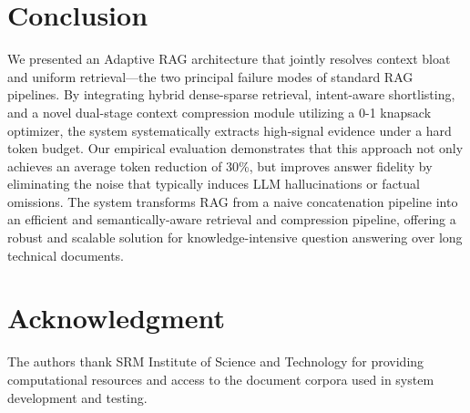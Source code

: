 \documentclass[conference]{IEEEtran}
\begin{document}
\section{Conclusion}
We presented an Adaptive RAG architecture that jointly resolves context bloat and uniform retrieval---the two principal failure modes of standard RAG pipelines. By integrating hybrid dense-sparse retrieval, intent-aware shortlisting, and a novel dual-stage context compression module utilizing a 0-1 knapsack optimizer, the system systematically extracts high-signal evidence under a hard token budget. Our empirical evaluation demonstrates that this approach not only achieves an average token reduction of 30\%, but improves answer fidelity by eliminating the noise that typically induces LLM hallucinations or factual omissions. The system transforms RAG from a naive concatenation pipeline into an efficient and semantically-aware retrieval and compression pipeline, offering a robust and scalable solution for knowledge-intensive question answering over long technical documents.

\section*{Acknowledgment}
The authors thank SRM Institute of Science and Technology for
providing computational resources and access to the document
corpora used in system development and testing.
\end{document}
